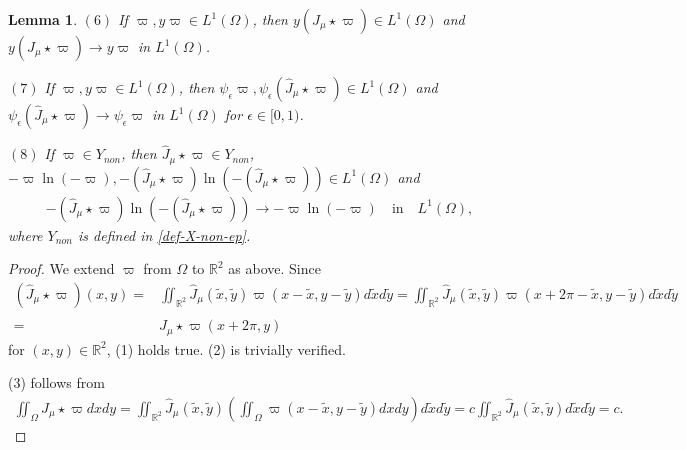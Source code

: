 \documentclass[1 [leqno, 11pt]{amsart}
\numberwithin{equation}{section}
\let\ep=\epsilon
\newtheorem{lemma}[Theorem]{Lemma}
\begin{document}
\begin{CJK*}{GBK}{song}
\begin{appendix}
\begin{lemma}
$(6)$ If $\varpi, y\varpi\in L^1(\Omega)$, then $y(\hat J_{\mu}\star\varpi)\in L^1(\Omega)$ and $y(\hat J_{\mu}\star\varpi)\to y\varpi$ in $L^1(\Omega)$.

$(7)$ If $\varpi, y\varpi\in L^1(\Omega)$, then $\psi_\ep\varpi, \psi_\ep(\hat J_{\mu}\star\varpi)\in L^1(\Omega)$ and $\psi_\ep(\hat J_{\mu}\star\varpi)\to \psi_\ep\varpi$ in $L^1(\Omega)$ for $\ep\in[0,1)$.

$(8)$ If $\varpi\in Y_{non}$, then $\hat J_{\mu}\star\varpi\in Y_{non}$, $-\varpi\ln(-\varpi),-(\hat J_{\mu}\star\varpi)\ln(-(\hat J_{\mu}\star\varpi))\in L^1(\Omega)$ and
\begin{align}\label{xlnx-convergence}
-(\hat J_{\mu}\star\varpi)\ln(-(\hat J_{\mu}\star\varpi))\to-\varpi\ln(-\varpi)\quad \text{in} \quad L^1(\Omega),
\end{align}
where $Y_{non}$ is defined in \eqref{def-X-non-ep}.
\end{lemma}
\begin{proof}
We extend $\varpi$ from $\Omega$ to $\mathbb{R}^2$ as above.
Since
\begin{align*}
(\hat J_{\mu}\star\varpi)(x,y)=&\iint_{\mathbb{R}^2}\hat J_\mu(\tilde x,\tilde y)\varpi(x-\tilde x,y-\tilde y)d\tilde x d\tilde y=\iint_{\mathbb{R}^2}\hat J_\mu(\tilde x,\tilde y)\varpi(x+2\pi-\tilde x,y-\tilde y)d\tilde x d\tilde y\\
=&\hat J_{\mu}\star\varpi(x+2\pi,y)
\end{align*}
for $(x,y)\in\mathbb{R}^2$, (1) holds true. (2) is trivially verified.

 (3) follows from
 \begin{align*}
 \iint_\Omega\hat J_{\mu}\star\varpi dxdy=\iint_{\mathbb{R}^2}\hat J_\mu(\tilde x,\tilde y)\left(\iint_\Omega\varpi(x-\tilde x,y-\tilde y) dxdy\right)d\tilde x d\tilde y=c\iint_{\mathbb{R}^2}\hat J_\mu(\tilde x,\tilde y)d\tilde x d\tilde y=c.
 \end{align*}


\end{proof}
\end{appendix}
\end{CJK*}
\end{document}
